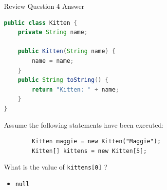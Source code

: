 \documentclass{beamer}
\begin{document}
\begin{frame}[fragile]{Review Question 4 Answer}
\vspace{-.05in}
\begin{lstlisting}[language=Java]
public class Kitten {
    private String name;

    public Kitten(String name) {
        name = name;
    }
    public String toString() {
        return "Kitten: " + name;
    }
}
\end{lstlisting}
\vspace{-.05in}
Assume the following statements have been executed:
\vspace{-.05in}
\begin{lstlisting}
        Kitten maggie = new Kitten("Maggie");
        Kitten[] kittens = new Kitten[5];
\end{lstlisting}
\vspace{-.05in}
What is the value of {\tt kittens[0]} ?
\begin{itemize}
\itemsep0em
\item {\tt null}
\end{itemize}
\end{frame}








\end{document}
